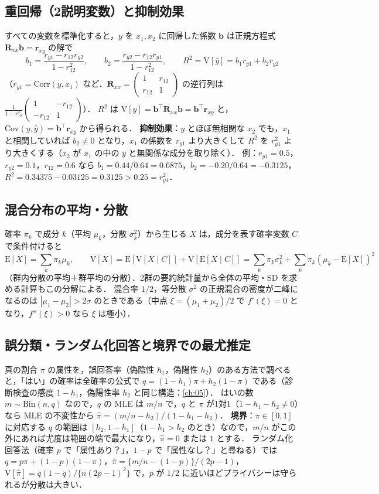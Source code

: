 \documentclass[a4paper,11pt,openany]{ltjsbook}
\newcommand{\E}{\mathrm{E}}
\newcommand{\V}{\mathrm{V}}
\newcommand{\Cov}{\mathrm{Cov}}
\newcommand{\Corr}{\mathrm{Corr}}
\newcommand{\Bin}{\mathrm{Bin}}
\newcommand{\transp}{^{\top}}
\begin{document}
\subsection{重回帰（2説明変数）と抑制効果}\label{subsec:G-reg}
すべての変数を標準化すると，$y$ を $x_1,x_2$ に回帰した係数 $\bm b$ は正規方程式 $\bm R_{xx}\bm b=\bm r_{xy}$ の解で
\[
b_1=\frac{r_{y1}-r_{12}r_{y2}}{1-r_{12}^2},\qquad b_2=\frac{r_{y2}-r_{12}r_{y1}}{1-r_{12}^2},\qquad R^2=\V[\hat y]=b_1r_{y1}+b_2r_{y2}
\]
（$r_{y1}=\Corr(y,x_1)$ など．$\bm R_{xx}=\begin{pmatrix}1&r_{12}\\r_{12}&1\end{pmatrix}$ の逆行列は $\frac1{1-r_{12}^2}\begin{pmatrix}1&-r_{12}\\-r_{12}&1\end{pmatrix}$）．
$R^2$ は $\V[\hat y]=\bm b\transp\bm R_{xx}\bm b=\bm b\transp\bm r_{xy}$ と，$\Cov(y,\hat y)=\bm b\transp\bm r_{xy}$ から得られる．
\textbf{抑制効果}：$y$ とほぼ無相関な $x_2$ でも，$x_1$ と相関していれば $b_2\ne0$ となり，$x_1$ の係数を $r_{y1}$ より大きくして $R^2$ を $r_{y1}^2$ より大きくする（$x_2$ が $x_1$ の中の $y$ と無関係な成分を取り除く）．
例：$r_{y1}=0.5$，$r_{y2}=0.1$，$r_{12}=0.6$ なら $b_1=0.44/0.64=0.6875$，$b_2=-0.20/0.64=-0.3125$，$R^2=0.34375-0.03125=0.3125>0.25=r_{y1}^2$．

\subsection{混合分布の平均・分散}\label{subsec:G-mixture}
確率 $\pi_k$ で成分 $k$（平均 $\mu_k$，分散 $\sigma_k^2$）から生じる $X$ は，成分を表す確率変数 $C$ で条件付けると
\[
\E[X]=\sum_k\pi_k\mu_k,\qquad \V[X]=\E[\V[X\mid C]]+\V[\E[X\mid C]]=\sum_k\pi_k\sigma_k^2+\sum_k\pi_k(\mu_k-\E[X])^2
\]
（群内分散の平均＋群平均の分散）．2群の要約統計量から全体の平均・SD を求める計算もこの分解による．
混合率 $1/2$，等分散 $\sigma^2$ の正規混合の密度が二峰になるのは $|\mu_1-\mu_2|>2\sigma$ のときである（中点 $\xi=(\mu_1+\mu_2)/2$ で $f'(\xi)=0$ となり，$f''(\xi)>0$ なら $\xi$ は極小）．

\subsection{誤分類・ランダム化回答と境界での最尤推定}\label{subsec:G-rr}
真の割合 $\pi$ の属性を，誤回答率（偽陰性 $h_1$，偽陽性 $h_2$）のある方法で調べると，「はい」の確率は全確率の公式で $q=(1-h_1)\pi+h_2(1-\pi)$ である（診断検査の感度 $1-h_1$，偽陽性率 $h_2$ と同じ構造：\cref{ch:05}）．
はいの数 $m\sim\Bin(n,q)$ なので，$q$ の MLE は $m/n$ で，$q$ と $\pi$ が1対1（$1-h_1-h_2\ne0$）なら MLE の不変性から
$\hat\pi=(m/n-h_2)/(1-h_1-h_2)$．
\textbf{境界}：$\pi\in[0,1]$ に対応する $q$ の範囲は $[h_2,1-h_1]$（$1-h_1>h_2$ のとき）なので，$m/n$ がこの外にあれば尤度は範囲の端で最大になり，$\hat\pi=0$ または $1$ とする．
ランダム化回答法（確率 $p$ で「属性あり？」，$1-p$ で「属性なし？」と尋ねる）では $q=p\pi+(1-p)(1-\pi)$，$\hat\pi=\{m/n-(1-p)\}/(2p-1)$，
$\V[\hat\pi]=q(1-q)/\{n(2p-1)^2\}$ で，$p$ が $1/2$ に近いほどプライバシーは守られるが分散は大きい．
\end{document}
